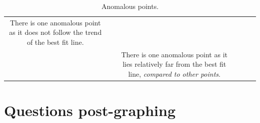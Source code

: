 \documentclass[oneside]{book}
\begin{document}
\begin{itemize}
\begin{table}[H]
\begin{tabular}{|Sc|Sc|Sc|}
\begin{minipage}{0.7\textwidth-135.33138pt}
                There is one anomalous point as it does not follow the trend of the best fit line.
            \end{minipage}\\
            &&
            \begin{minipage}{0.7\textwidth-135.33138pt}
                There is one anomalous point as it lies relatively far from the best fit line, \emph{compared to other points}.
            \end{minipage}\\
            \hline
        \end{tabular}
        \caption{Anomalous points.}
        \label{table:anomaly-statement}
    \end{table}
\end{itemize}
\section{Questions post-graphing}
\end{document}

